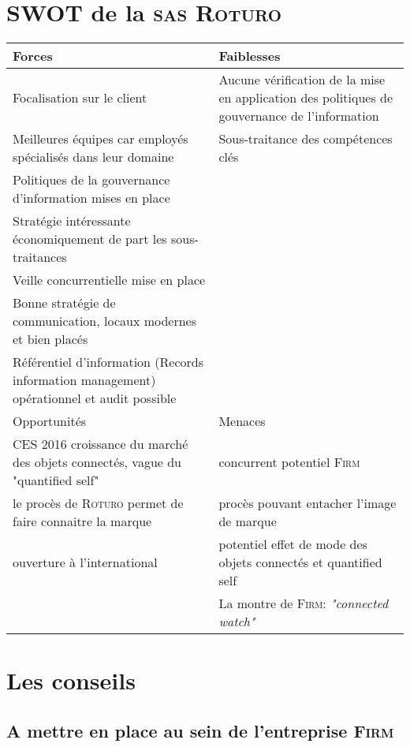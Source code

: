 \section{SWOT de la \textsc{sas Roturo}}
\begin{tabularx}{\linewidth}{|X|X|}
\hline
\hline
Forces & Faiblesses\\
\hline
\hline
Focalisation sur le client
& Aucune vérification de la mise en application des politiques de gouvernance de l'information\\
\hline
Meilleures équipes car employés spécialisés dans leur domaine
& Sous-traitance des compétences clés \\
\hline
Politiques de la gouvernance d'information mises en place
& \\
\hline
Stratégie intéressante économiquement de part les sous-traitances 
& \\
\hline
Veille concurrentielle mise en place 
& \\
\hline
Bonne stratégie de communication, locaux modernes et bien placés 
& \\
\hline
Référentiel d'information (Records information management) opérationnel et audit possible 
& \\
\hline
\hline
Opportunités & Menaces\\
\hline
\hline
CES 2016 croissance du marché des objets connectés, vague du "quantified self"
& concurrent potentiel \textsc{Firm}\\
\hline
le procès de \textsc{Roturo} permet de faire connaitre la marque
& procès pouvant entacher l'image de marque\\
\hline
ouverture à l'international
& potentiel effet de mode des objets connectés et quantified self\\
\hline
& La montre de \textsc{Firm}: \textit{"connected watch"}\\
\hline
\end{tabularx}
\section{Les conseils}
\subsection{A mettre en place au sein de l'entreprise \textsc{Firm}}
